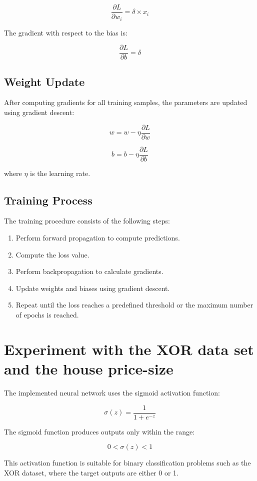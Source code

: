 \documentclass{article}
\begin{document}
\[
\frac{\partial L}{\partial w_i} = \delta \times x_i
\]

The gradient with respect to the bias is:

\[
\frac{\partial L}{\partial b} = \delta
\]

\subsection{Weight Update}

After computing gradients for all training samples, the parameters are updated using gradient descent:

\[
w = w - \eta \frac{\partial L}{\partial w}
\]

\[
b = b - \eta \frac{\partial L}{\partial b}
\]

where $\eta$ is the learning rate.

\subsection{Training Process}

The training procedure consists of the following steps:

\begin{enumerate}
    \item Perform forward propagation to compute predictions.
    \item Compute the loss value.
    \item Perform backpropagation to calculate gradients.
    \item Update weights and biases using gradient descent.
    \item Repeat until the loss reaches a predefined threshold or the maximum number of epochs is reached.
\end{enumerate}

\section{Experiment with the XOR data set and the house price-size}

The implemented neural network uses the sigmoid activation function:

\[
\sigma(z) = \frac{1}{1 + e^{-z}}
\]

The sigmoid function produces outputs only within the range:

\[
0 < \sigma(z) < 1
\]

This activation function is suitable for binary classification problems such as the XOR dataset, where the target outputs are either 0 or 1.
\end{document}
